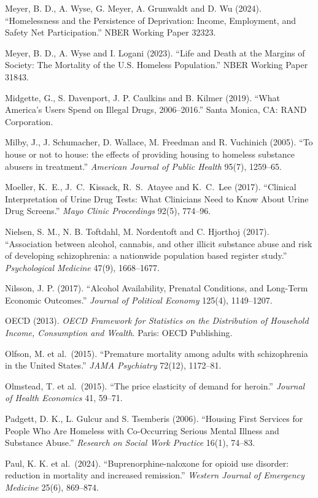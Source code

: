 \documentclass[10pt]{article}
\begin{document}
{\begin{list}{}{\setlength{\leftmargin}{1.5em}\setlength{\itemindent}{-1.5em}\setlength{\itemsep}{0.35em}\setlength{\parsep}{0em}}
\item Meyer, B. D., A. Wyse, G. Meyer, A. Grunwaldt and D. Wu (2024). ``Homelessness and the Persistence of Deprivation: Income, Employment, and Safety Net Participation.'' NBER Working Paper 32323.
\item Meyer, B. D., A. Wyse and I. Logani (2023). ``Life and Death at the Margins of Society: The Mortality of the U.S. Homeless Population.'' NBER Working Paper 31843.
\item Midgette, G., S. Davenport, J. P. Caulkins and B. Kilmer (2019). ``What America's Users Spend on Illegal Drugs, 2006--2016.'' Santa Monica, CA: RAND Corporation.
\item Milby, J., J. Schumacher, D. Wallace, M. Freedman and R. Vuchinich (2005). ``To house or not to house: the effects of providing housing to homeless substance abusers in treatment.'' \emph{American Journal of Public Health} 95(7), 1259--65.
\item Moeller, K.\ E., J.\ C.\ Kissack, R.\ S.\ Atayee and K.\ C.\ Lee (2017). ``Clinical Interpretation of Urine Drug Tests: What Clinicians Need to Know About Urine Drug Screens.'' \emph{Mayo Clinic Proceedings} 92(5), 774--96.
\item Nielsen, S. M., N. B. Toftdahl, M. Nordentoft and C. Hjorthoj (2017). ``Association between alcohol, cannabis, and other illicit substance abuse and risk of developing schizophrenia: a nationwide population based register study.'' \emph{Psychological Medicine} 47(9), 1668--1677.
\item Nilsson, J. P. (2017). ``Alcohol Availability, Prenatal Conditions, and Long-Term Economic Outcomes.'' \emph{Journal of Political Economy} 125(4), 1149--1207.
\item OECD (2013). \emph{OECD Framework for Statistics on the Distribution of Household Income, Consumption and Wealth}. Paris: OECD Publishing.
\item Olfson, M. et al.\ (2015). ``Premature mortality among adults with schizophrenia in the United States.'' \emph{JAMA Psychiatry} 72(12), 1172--81.
\item Olmstead, T. et al.\ (2015). ``The price elasticity of demand for heroin.'' \emph{Journal of Health Economics} 41, 59--71.
\item Padgett, D. K., L. Gulcur and S. Tsemberis (2006). ``Housing First Services for People Who Are Homeless with Co-Occurring Serious Mental Illness and Substance Abuse.'' \emph{Research on Social Work Practice} 16(1), 74--83.
\item Paul, K. K. et al.\ (2024). ``Buprenorphine-naloxone for opioid use disorder: reduction in mortality and increased remission.'' \emph{Western Journal of Emergency Medicine} 25(6), 869--874.

\end{list}}
\end{document}

